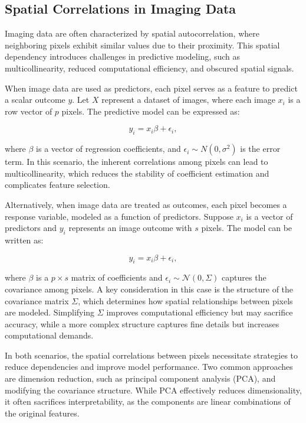 \documentclass[12pt]{article}
\begin{document}
\subsection{Spatial Correlations in Imaging Data}

Imaging data are often characterized by spatial autocorrelation, where neighboring pixels exhibit similar values due to their proximity. This spatial dependency introduces challenges in predictive modeling, such as multicollinearity, reduced computational efficiency, and obscured spatial signals.

When image data are used as predictors, each pixel serves as a feature to predict a scalar outcome \( y \). Let \( X \) represent a dataset of images, where each image \( x_i \) is a row vector of \( p \) pixels. The predictive model can be expressed as:

\[
	y_i = x_i \beta + \epsilon_i,
\]

where \( \beta \) is a vector of regression coefficients, and \( \epsilon_i \sim N (0, \sigma^2) \) is the error term. In this scenario, the inherent correlations among pixels can lead to multicollinearity, which reduces the stability of coefficient estimation and complicates feature selection.

Alternatively, when image data are treated as outcomes, each pixel becomes a response variable, modeled as a function of predictors. Suppose \( x_i \) is a vector of predictors and \( y_i \) represents an image outcome with \( s \) pixels. The model can be written as:

\[
	y_i = x_i \beta + \epsilon_i,
\]

where \( \beta \) is a \( p \times s \) matrix of coefficients and \( \epsilon_i \sim \mathcal{N}(0, \Sigma) \) captures the covariance among pixels. A key consideration in this case is the structure of the covariance matrix \( \Sigma \), which determines how spatial relationships between pixels are modeled. Simplifying \( \Sigma \) improves computational efficiency but may sacrifice accuracy, while a more complex structure captures fine details but increases computational demands.

In both scenarios, the spatial correlations between pixels necessitate strategies to reduce dependencies and improve model performance. Two common approaches are dimension reduction, such as principal component analysis (PCA), and modifying the covariance structure. While PCA effectively reduces dimensionality, it often sacrifices interpretability, as the components are linear combinations of the original features.
\end{document}
